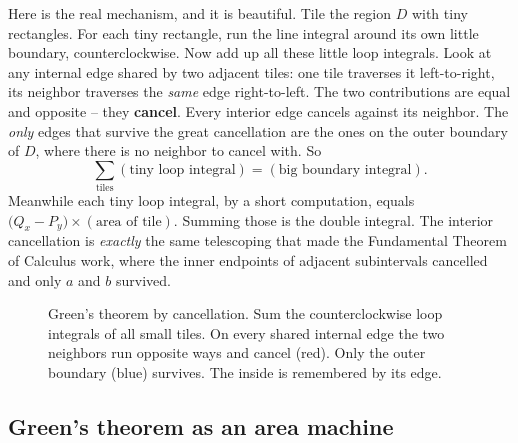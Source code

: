 \begin{happeningbox}
Here is the real mechanism, and it is beautiful. Tile the region $D$ with tiny
rectangles. For each tiny rectangle, run the line integral around its own little
boundary, counterclockwise. Now add up all these little loop integrals. Look at
any internal edge shared by two adjacent tiles: one tile traverses it
left-to-right, its neighbor traverses the \emph{same} edge right-to-left. The two
contributions are equal and opposite -- they \textbf{cancel}. Every interior edge
cancels against its neighbor. The \emph{only} edges that survive the great
cancellation are the ones on the outer boundary of $D$, where there is no neighbor
to cancel with. So
\[
  \sum_{\text{tiles}} (\text{tiny loop integral}) = (\text{big boundary integral}).
\]
Meanwhile each tiny loop integral, by a short computation, equals
$\big(Q_x - P_y\big)\times(\text{area of tile})$. Summing those is the double
integral. The interior cancellation is \emph{exactly} the same telescoping that
made the Fundamental Theorem of Calculus work, where the inner endpoints of
adjacent subintervals cancelled and only $a$ and $b$ survived.
\end{happeningbox}

\begin{figure}[H]
\centering
{}
\caption{Green's theorem by cancellation. Sum the counterclockwise loop integrals
of all small tiles. On every shared internal edge the two neighbors run opposite
ways and cancel (red). Only the outer boundary (blue) survives. The inside is
remembered by its edge.}
\label{ch35:fig-green-cancel}
\end{figure}

\subsection{Green's theorem as an area machine}

